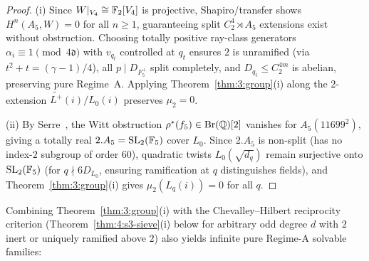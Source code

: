 \begin{proof}
(i) Since $W|_{V_4} \cong \mathbb{F}_2[V_4]$ is projective, Shapiro/transfer shows $H^n(A_5, W) = 0$ for all $n \ge 1$, guaranteeing split $C_2^4 \rtimes A_5$ extensions exist without obstruction. Choosing totally positive ray-class generators $\alpha_i \equiv 1 \pmod{4\mathfrak{d}}$ with $v_{q_t}$ controlled at $q_t$ ensures $2$ is unramified (via $t^2 + t = (\gamma-1)/4$), all $p \mid D_{F_5^+}$ split completely, and $D_{q_t} \le C_2^{4m}$ is abelian, preserving pure Regime~A. Applying Theorem~\ref{thm:3:group}(i) along the $2$-extension $\widetilde{L^+}(i)/L_0(i)$ preserves $\mu_2 = 0$.

(ii) By Serre~\cite[Thm.~1]{Serre1984}, the Witt obstruction $\rho^*(f_5) \in \mathrm{Br}(\mathbb{Q})[2]$ vanishes for $A_5(11699^2)$, giving a totally real $2.A_5 = \mathrm{SL}_2(\mathbb{F}_5)$ cover $L_0$. Since $2.A_5$ is non-split (has no index-$2$ subgroup of order $60$), quadratic twists $L_0(\sqrt{d_q})$ remain surjective onto $\mathrm{SL}_2(\mathbb{F}_5)$ (for $q \nmid 6 D_{L_0}$, ensuring ramification at $q$ distinguishes fields), and Theorem~\ref{thm:3:group}(i) gives $\mu_2(L_q(i)) = 0$ for all $q$.
\end{proof}

Combining Theorem~\ref{thm:3:group}(i) with the Chevalley--Hilbert reciprocity criterion (Theorem~\ref{thm:4:s3-sieve}(i) below for arbitrary odd degree $d$ with $2$ inert or uniquely ramified above $2$) also yields infinite pure Regime-A solvable families:

